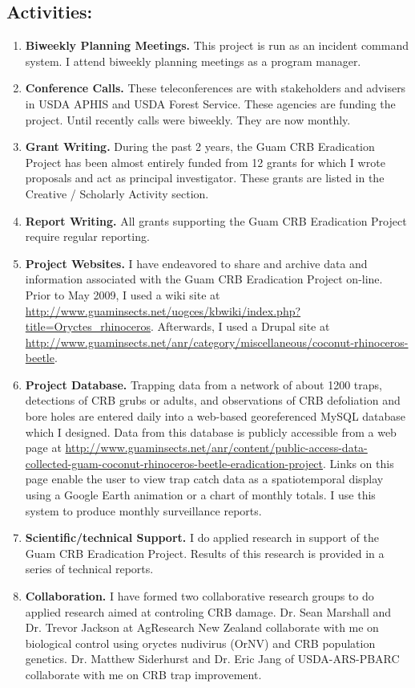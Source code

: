 \documentclass[12pt,oneside,english]{scrbook}
\begin{document}
\subsection{Activities:}
\begin{enumerate}
\item \textbf{Biweekly Planning Meetings.} This project is run as an incident
command system. I attend biweekly planning meetings as a program manager.
\item \textbf{Conference Calls.} These teleconferences are with stakeholders
and advisers in USDA APHIS and USDA Forest Service. These agencies
are funding the project. Until recently calls were biweekly. They
are now monthly.
\item \textbf{Grant Writing. }During the past 2 years, the Guam CRB Eradication
Project has been almost entirely funded from 12 grants for which I
wrote proposals and act as principal investigator. These grants are
listed in the Creative / Scholarly Activity section.
\item \textbf{Report Writing.} All grants supporting the Guam CRB Eradication
Project require regular reporting. 
\item \textbf{Project Websites. }I have endeavored to share and archive
data and information associated with the Guam CRB Eradication Project
on-line. Prior to May 2009, I used a wiki site at \url{http://www.guaminsects.net/uogces/kbwiki/index.php?title=Oryctes_rhinoceros}.
Afterwards, I used a Drupal site at \url{http://www.guaminsects.net/anr/category/miscellaneous/coconut-rhinoceros-beetle}.
\item \textbf{Project Database. }Trapping data from a network of about 1200
traps, detections of CRB grubs or adults, and observations of CRB
defoliation and bore holes are entered daily into a web-based georeferenced
MySQL database which I designed. Data from this database is publicly
accessible from a web page at \url{http://www.guaminsects.net/anr/content/public-access-data-collected-guam-coconut-rhinoceros-beetle-eradication-project}.
Links on this page enable the user to view trap catch data as a spatiotemporal
display using a Google Earth animation or a chart of monthly totals.
I use this system to produce monthly surveillance reports. 
\item \textbf{Scientific/technical Support.} I do applied research in support
of the Guam CRB Eradication Project. Results of this research is provided
in a series of technical reports. 
\item \textbf{Collaboration.} I have formed two collaborative research groups
to do applied research aimed at controling CRB damage. Dr. Sean Marshall
and Dr. Trevor Jackson at AgResearch New Zealand collaborate with
me on biological control using oryctes nudivirus (OrNV) and CRB population
genetics. Dr. Matthew Siderhurst and Dr. Eric Jang of USDA-ARS-PBARC
collaborate with me on CRB trap improvement. 
\end{enumerate}
\end{document}
